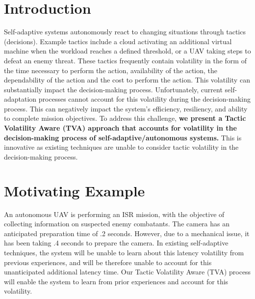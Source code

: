 \documentclass{article}
\title{\Title}
\author{
	TPOC: Daniel E. Krutz and Qi Yu; \{dxkvse, qi.yu\}@rit.edu\\
}
\date{} %
\begin{document}
\maketitle
\vspace{-10mm}
\section{Introduction}




Self-adaptive systems autonomously react to changing situations through tactics (decisions). Example tactics include a cloud activating an additional virtual machine when the workload reaches a defined threshold, or a UAV taking steps to defeat an enemy threat. These tactics frequently contain volatility in the form of the time necessary to perform the action, availability of the action, the dependability of the action and the cost to perform the action. This volatility can substantially impact the decision-making process. Unfortunately, current self-adaptation processes cannot account for this volatility during the decision-making process. This can negatively impact the system's efficiency, resiliency, and ability to complete mission objectives. To address this challenge, \textbf{we present a Tactic Volatility Aware (TVA) approach that accounts for volatility in the decision-making process of self-adaptive/autonomous systems.} This is innovative as existing techniques are unable to consider tactic volatility in the decision-making process.


\section{Motivating Example}

An autonomous UAV is performing an ISR mission, with the objective of collecting information on suspected enemy combatants. The camera has an anticipated preparation time of .2 seconds. However, due to a mechanical issue, it has been taking .4 seconds to prepare the camera. In existing self-adaptive techniques, the system will be unable to learn about this latency volatility from previous experiences, and will be therefore unable to account for this unanticipated additional latency time. Our Tactic Volatility Aware (TVA) process will enable the system to learn from prior experiences and account for this volatility.
\end{document}
